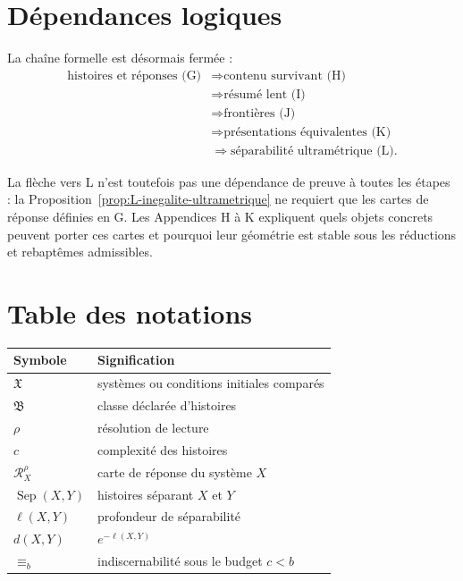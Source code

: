 \section{Dépendances logiques}
\label{annexe-L-dependances}

La chaîne formelle est désormais fermée :
\[
\boxed{
\begin{aligned}
\text{histoires et réponses (G)}
&\Longrightarrow \text{contenu survivant (H)}\\
&\Longrightarrow \text{résumé lent (I)}\\
&\Longrightarrow \text{frontières (J)}\\
&\Longrightarrow \text{présentations équivalentes (K)}\\
&\Longrightarrow \text{séparabilité ultramétrique (L)}.
\end{aligned}
}
\]

La flèche vers L n'est toutefois pas une dépendance de preuve à toutes les étapes : la Proposition~\ref{prop:L-inegalite-ultrametrique} ne requiert que les cartes de réponse définies en G. Les Appendices H à K expliquent quels objets concrets peuvent porter ces cartes et pourquoi leur géométrie est stable sous les réductions et rebaptêmes admissibles.

\section{Table des notations}
\label{annexe-L-notations}

\begin{center}
\begin{tabular}{ll}
\hline
Symbole & Signification \\
\hline
\(\mathfrak X\) & systèmes ou conditions initiales comparés \\
\(\mathfrak B\) & classe déclarée d'histoires \\
\(\rho\) & résolution de lecture \\
\(c\) & complexité des histoires \\
\(\mathcal R_X^\rho\) & carte de réponse du système \(X\) \\
\(\operatorname{Sep}(X,Y)\) & histoires séparant \(X\) et \(Y\) \\
\(\ell(X,Y)\) & profondeur de séparabilité \\
\(d(X,Y)\) & \(e^{-\ell(X,Y)}\) \\
\(\equiv_b\) & indiscernabilité sous le budget \(c<b\) \\
\hline
\end{tabular}
\end{center}

